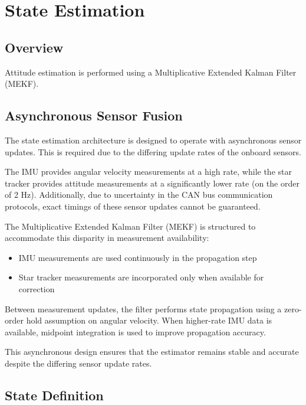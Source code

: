 \chapter{State Estimation}

\section{Overview}

Attitude estimation is performed using a Multiplicative Extended Kalman Filter (MEKF).

\section{Asynchronous Sensor Fusion}

The state estimation architecture is designed to operate with asynchronous sensor updates. This is required due to the differing update rates of the onboard sensors.

The IMU provides angular velocity measurements at a high rate, while the star tracker provides attitude measurements at a significantly lower rate (on the order of 2 Hz). Additionally, due to uncertainty in the CAN bus communication protocols, exact timings of these sensor updates cannot be guaranteed.

The Multiplicative Extended Kalman Filter (MEKF) is structured to accommodate this disparity in measurement availability:

\begin{itemize}
	\item IMU measurements are used continuously in the propagation step
	\item Star tracker measurements are incorporated only when available for correction
\end{itemize}

Between measurement updates, the filter performs state propagation using a zero-order hold assumption on angular velocity. When higher-rate IMU data is available, midpoint integration is used to improve propagation accuracy.

This asynchronous design ensures that the estimator remains stable and accurate despite the differing sensor update rates.

\section{State Definition}

